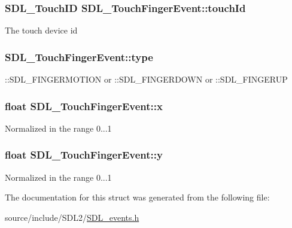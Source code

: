 \subsubsection[{touch\+Id}]{\setlength{\rightskip}{0pt plus 5cm}S\+D\+L\+\_\+\+Touch\+I\+D S\+D\+L\+\_\+\+Touch\+Finger\+Event\+::touch\+Id}\label{struct_s_d_l___touch_finger_event_ad7a6f39ec9af1bf47b160d18314edd70}
The touch device id \hypertarget{struct_s_d_l___touch_finger_event_a3883218fa3426065ca66086c100edbfa}{}
\subsubsection[{type}]{ S\+D\+L\+\_\+\+Touch\+Finger\+Event\+::type}\label{struct_s_d_l___touch_finger_event_a3883218fa3426065ca66086c100edbfa}
\+::\+S\+D\+L\+\_\+\+F\+I\+N\+G\+E\+R\+M\+O\+T\+I\+O\+N or \+::\+S\+D\+L\+\_\+\+F\+I\+N\+G\+E\+R\+D\+O\+W\+N or \+::\+S\+D\+L\+\_\+\+F\+I\+N\+G\+E\+R\+U\+P \hypertarget{struct_s_d_l___touch_finger_event_a0ce44b1342220fa17e9b9b4a77c2c906}{}
\subsubsection[{x}]{\setlength{\rightskip}{0pt plus 5cm}float S\+D\+L\+\_\+\+Touch\+Finger\+Event\+::x}\label{struct_s_d_l___touch_finger_event_a0ce44b1342220fa17e9b9b4a77c2c906}
Normalized in the range 0...1 \hypertarget{struct_s_d_l___touch_finger_event_ac2bb8af638d2927a8e13f6ffe8f9384e}{}
\subsubsection[{y}]{\setlength{\rightskip}{0pt plus 5cm}float S\+D\+L\+\_\+\+Touch\+Finger\+Event\+::y}\label{struct_s_d_l___touch_finger_event_ac2bb8af638d2927a8e13f6ffe8f9384e}
Normalized in the range 0...1 

The documentation for this struct was generated from the following file\+:\begin{DoxyCompactItemize}
\item 
source/include/\+S\+D\+L2/\hyperlink{_s_d_l__events_8h}{S\+D\+L\+\_\+events.\+h}\end{DoxyCompactItemize}
